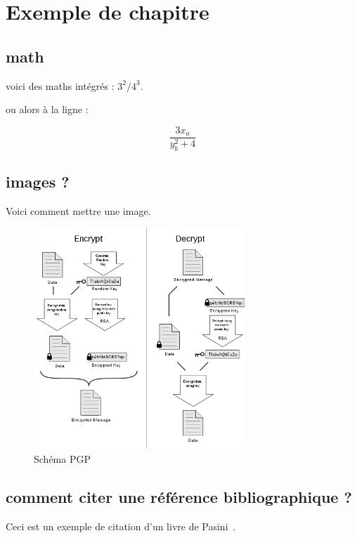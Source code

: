 

\chapter{Exemple de chapitre}

\lipsum[1]


\section{math}

voici des maths intégrés : $3^2 / 4^3$.

ou alors à la ligne :

$$ \frac{3 x_a}{ y_b^2 +4}$$

\section{images ?}

Voici comment mettre une image.

\begin{figure}
	\centering
	\includegraphics[width=8cm]{images/PGP_101.png}
	\caption{Schéma PGP}
	\label{fig:pgp}
\end{figure}


\section{comment citer une référence bibliographique ?}

Ceci est un exemple de citation d'un livre de Pasini~\cite{pasini2015}.

